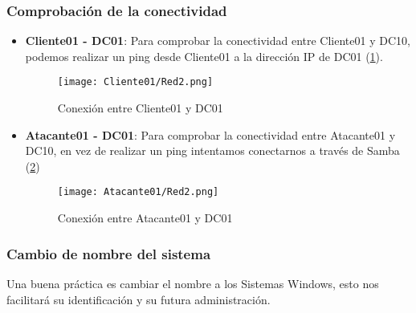 \subsubsection{Comprobación de la conectividad}

\begin{itemize}

\item \textbf{Cliente01 - DC01}: Para comprobar la conectividad entre Cliente01 y DC10, podemos realizar un ping desde Cliente01 a la dirección IP de DC01 (\ref{Cliente01-Red2}).
\begin{figure}[H] %
\begin{center}
\texttt{[image: Cliente01/Red2.png]}
\end{center}
\caption{Conexión entre Cliente01 y DC01}
\label{Cliente01-Red2}
\end{figure}

\item \textbf{Atacante01 - DC01}: Para comprobar la conectividad entre Atacante01 y DC10, en vez de realizar un ping intentamos conectarnos a través de Samba (\ref{Atacante01-Red2})
\begin{figure}[H] %
\begin{center}
\texttt{[image: Atacante01/Red2.png]}
\end{center}
\caption{Conexión entre Atacante01 y DC01}
\label{Atacante01-Red2}
\end{figure}

\end{itemize}

\subsubsection{Cambio de nombre del sistema}

Una buena práctica es cambiar el nombre a los Sistemas Windows, esto nos facilitará su identificación y su futura administración. 

